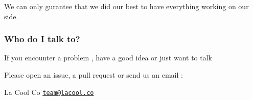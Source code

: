 We can only gurantee that we did our best to have everything working on our side.

\subsubsection*{Who do I talk to?}

If you encounter a problem , have a good idea or just want to talk

Please open an issue, a pull request or send us an email \+:

La Cool Co \href{mailto:team@lacool.co}{\tt team@lacool.\+co} 